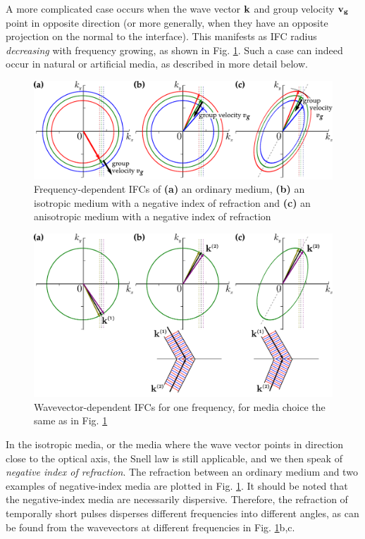A more complicated case occurs when the wave vector ${\mathbf{k}}$ and group velocity ${\mathbf{v_g}}$ point in opposite direction (or more generally, when they have an opposite projection on the normal to the interface).  This manifests as IFC radius \textit{decreasing} with frequency growing, as shown in  Fig. \ref{fg_ifcnr}.
Such a case can indeed occur in natural or artificial media, as described in more detail below. 
\begin{figure}[ht] \caption{Frequency-dependent IFCs of \textbf{(a)} an ordinary medium, \textbf{(b)} an isotropic medium with a negative index of refraction and \textbf{(c)} an anisotropic medium with a negative index of refraction } \label{fg_ifcnr} \centering  %
	\includegraphics[width=.8\textwidth]{img/ifc_negrefr.pdf} 
\end{figure}
\begin{figure}[ht] \caption{Wavevector-dependent IFCs for one frequency, for media choice the same as in Fig. \ref{fg_ifcnr} } \label{fg_ifcnrk} \centering  %
	\includegraphics[width=.8\textwidth]{img/ifc_negrefrk.pdf} 
\end{figure}

In the isotropic media, or the media where the wave vector points in direction close to the optical axis, the Snell law is still applicable, and we then speak of \textit{negative index of refraction}.  The refraction between an ordinary medium and two examples of negative-index media are plotted in Fig. \ref{fg_ifcnr}.
It should be noted that the negative-index media are necessarily dispersive. Therefore, the refraction of temporally short pulses disperses different frequencies into different angles, as can be found from the wavevectors at different frequencies in Fig. \ref{fg_ifcnr}b,c.

